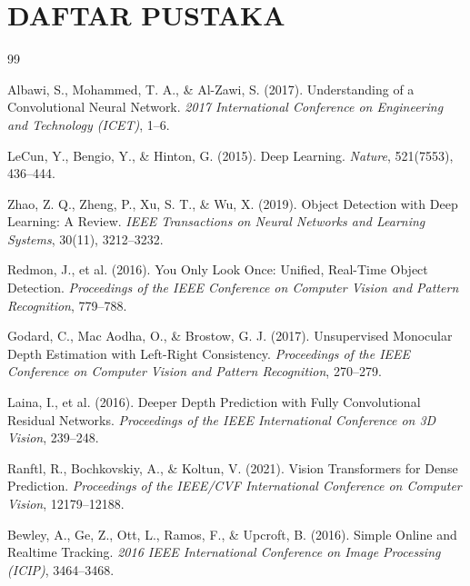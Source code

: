\documentclass[12pt,a4paper]{article}
\begin{document}

\clearpage
{}

\section*{DAFTAR PUSTAKA}

\onehalfspacing

\begin{thebibliography}{99}

Albawi, S., Mohammed, T. A., \& Al-Zawi, S. (2017). Understanding of a Convolutional Neural Network. \textit{2017 International Conference on Engineering and Technology (ICET)}, 1--6.

LeCun, Y., Bengio, Y., \& Hinton, G. (2015). Deep Learning. \textit{Nature}, 521(7553), 436--444.

Zhao, Z. Q., Zheng, P., Xu, S. T., \& Wu, X. (2019). Object Detection with Deep Learning: A Review. \textit{IEEE Transactions on Neural Networks and Learning Systems}, 30(11), 3212--3232.

Redmon, J., et al. (2016). You Only Look Once: Unified, Real-Time Object Detection. \textit{Proceedings of the IEEE Conference on Computer Vision and Pattern Recognition}, 779--788.

Godard, C., Mac Aodha, O., \& Brostow, G. J. (2017). Unsupervised Monocular Depth Estimation with Left-Right Consistency. \textit{Proceedings of the IEEE Conference on Computer Vision and Pattern Recognition}, 270--279.

Laina, I., et al. (2016). Deeper Depth Prediction with Fully Convolutional Residual Networks. \textit{Proceedings of the IEEE International Conference on 3D Vision}, 239--248.

Ranftl, R., Bochkovskiy, A., \& Koltun, V. (2021). Vision Transformers for Dense Prediction. \textit{Proceedings of the IEEE/CVF International Conference on Computer Vision}, 12179--12188.

Bewley, A., Ge, Z., Ott, L., Ramos, F., \& Upcroft, B. (2016). Simple Online and Realtime Tracking. \textit{2016 IEEE International Conference on Image Processing (ICIP)}, 3464--3468.


\end{thebibliography}
\end{document}
